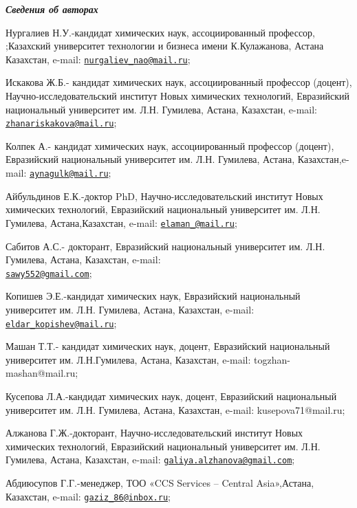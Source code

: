 \begin{authorinfo}
\hspace{1em}\emph{{\bfseries Сведения об авторах}}

Нургалиев Н.У.-кандидат химических наук, ассоциированный профессор,
;Казахский университет технологии и бизнеса имени К.Кулажанова, Астана
Казахстан, e-mail:
\href{mailto:nurgaliev_nao@mail.ru}{\nolinkurl{nurgaliev\_nao@mail.ru}};

Искакова Ж.Б.- кандидат химических наук, ассоциированный профессор
(доцент), Научно-исследовательский институт Новых химических технологий,
Евразийский национальный университет им. Л.Н. Гумилева, Астана,
Казахстан, e-mail:
\href{mailto:zhanariskakova@mail.ru}{\nolinkurl{zhanariskakova@mail.ru}};

Колпек А.- кандидат химических наук, ассоциированный профессор (доцент),
Евразийский национальный университет им. Л.Н. Гумилева, Астана,
Казахстан,e-mail:
\href{mailto:aynagulk@mail.ru}{\nolinkurl{aynagulk@mail.ru}};

Айбульдинов Е.К.-доктор PhD, Научно-исследовательский институт Новых
химических технологий, Евразийский национальный университет им. Л.Н.
Гумилева, Астана,Казахстан, e-mail:
\href{mailto:elaman_@mail.ru}{\nolinkurl{elaman\_@mail.ru}};

Сабитов А.С.- докторант, Евразийский национальный университет им. Л.Н.
Гумилева, Астана, Казахстан, e-mail:
\\\href{mailto:sawy552@gmail.com}{\nolinkurl{sawy552@gmail.com}};

Копишев Э.Е.-кандидат химических наук, Евразийский национальный
университет им. Л.Н. Гумилева, Астана, Казахстан, e-mail:
\href{mailto:eldar_kopishev@mail.ru}{\nolinkurl{eldar\_kopishev@mail.ru}};

Машан Т.Т.- кандидат химических наук, доцент, Евразийский национальный
университет им. Л.Н.Гумилева, Астана, Казахстан, e-mail:
togzhan-mashan@mail.ru;

Кусепова Л.А.-кандидат химических наук, доцент, Евразийский национальный
университет им. Л.Н. Гумилева, Астана, Казахстан, e-mail:
kusepova71@mail.ru;

Алжанова Г.Ж.-докторант, Научно-исследовательский институт Новых
химических технологий, Евразийский национальный университет им. Л.Н.
Гумилева, Астана, Казахстан, e-mail:
\href{mailto:galiya.alzhanova@gmail.com}{\nolinkurl{galiya.alzhanova@gmail.com}};

Абдиюсупов Г.Г.-менеджер, ТОО «CCS Services -- Central Asia»,Астана,
Казахстан, e-mail:
\href{mailto:gaziz_86@inbox.ru}{\nolinkurl{gaziz\_86@inbox.ru}};


\end{authorinfo}

